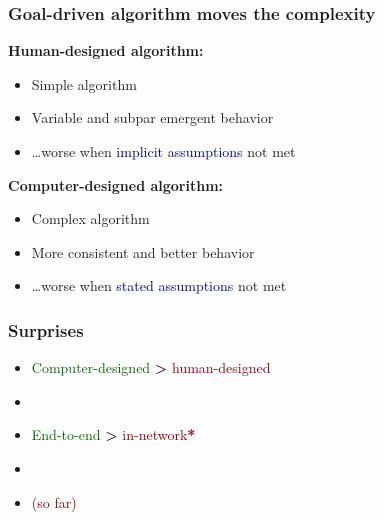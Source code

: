 \documentclass[svgnames]{beamer}
\begin{document}
\begin{frame}
\frametitle{Goal-driven algorithm \textbf{moves} the complexity}

\textbf{Human-designed algorithm:}

\begin{itemize}
\item Simple algorithm
\item Variable and subpar emergent behavior
\item[] \ldots worse when \textcolor{DarkBlue}{implicit assumptions} not met
\end{itemize}

\textbf{Computer-designed algorithm:}

\begin{itemize}
\item Complex algorithm
\item More consistent and better behavior
\item[] \ldots worse when \textcolor{DarkBlue}{stated assumptions} not met
\end{itemize}

\end{frame}

\begin{frame}
\frametitle{Surprises}

\LARGE

\begin{itemize}

\item \textcolor{DarkGreen}{Computer-designed} {\LARGE \textbf{\textgreater}} \textcolor{DarkRed}{human-designed}

\item[]

\item \textcolor{DarkGreen}{End-to-end} {\LARGE \textbf{\textgreater}} \textcolor{DarkRed}{in-network{\LARGE \textbf{*}}}

\item[]

\item[] \hspace{6.0 cm}\normalsize\textcolor{DarkRed}{{\bf *} (so far)}

\end{itemize}

\end{frame}
\end{document}
